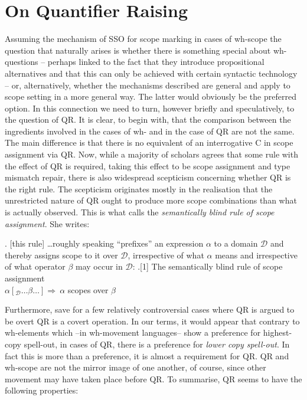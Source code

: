 \documentclass[charis]{glossa}
\begin{document}
\section{On Quantifier Raising}
Assuming the mechanism of SSO for scope marking in cases of wh-scope the question that naturally arises is whether there is something special about wh-questions -- perhaps linked to the fact that they introduce propositional alternatives and that this can only be achieved with certain syntactic technology -- or, alternatively, whether the mechanisms described are general and apply to scope setting in a more general way.  The latter would obviously be the preferred option.  In this connection we need to turn, however briefly and speculatively, to the question of QR.  It is clear, to begin with, that the comparison between the ingredients involved in the cases of wh- and in the case of QR are not the same.  The main difference is that there is no equivalent of an interrogative C in scope assignment via QR.  Now, while a majority of scholars agrees that some rule with the effect of QR is required, taking this effect to be scope assignment and type mismatch repair, there is also widespread scepticism concerning whether QR is the right rule.  The scepticism originates mostly in the realisation that the unrestricted nature of QR ought to produce more scope combinations than what is actually observed. This is what \cite{szabolcsi:1997c} calls the
\emph{semantically blind rule of scope assignment}.  She writes:

\ex.  [this rule] \ldots roughly speaking ``prefixes'' an expression
$\alpha$ to a domain $\mathcal{D}$ and thereby assigns scope to it
over $\mathcal{D}$, irrespective of what $\alpha$ means and
irrespective of what operator $\beta$ may occur in $\mathcal{D}$:
\ex.[1] The semantically blind rule of scope assignment\\
 $\alpha[_{\mathcal{D}} \ldots \beta \ldots] \Rightarrow \
\alpha$ scopes over $ \beta$
\begin{flushright}
\cite[109]{szabolcsi:1997c}
\end{flushright}

Furthermore, save for a few relatively controversial cases where QR is argued to be overt \citep{fox-nissenbaum:99} QR is a covert operation.  In our terms, it would appear that contrary to wh-elements which --in wh-movement languages-- show a preference for highest-copy spell-out, in cases of QR, there is a preference for  \textit{lower copy spell-out}.  In fact this is more than a preference, it is almost a requirement for QR.  QR and wh-scope are not the mirror image of one another, of course, since other movement may have taken place before QR.  To summarise, QR seems to have the following properties:
\end{document}
